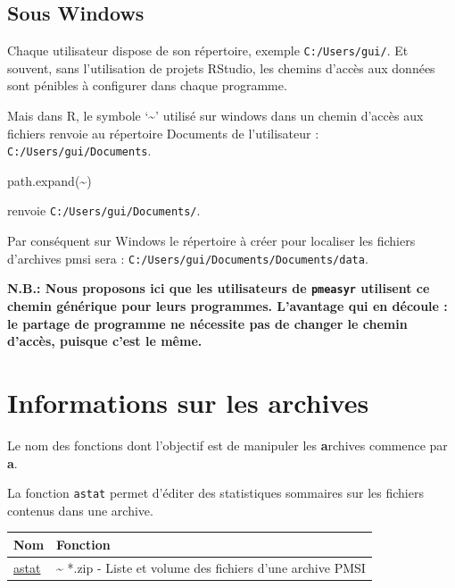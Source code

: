 \documentclass[
]{book}
\newenvironment{Shaded}{\begin{snugshade}}{\end{snugshade}}
\newcommand{\FunctionTok}[1]{\textcolor[rgb]{0.00,0.00,0.00}{#1}}
\newcommand{\NormalTok}[1]{#1}
\newcommand{\StringTok}[1]{\textcolor[rgb]{0.31,0.60,0.02}{#1}}
\begin{document}
\hypertarget{sous-windows}{%
\subsection{Sous Windows}\label{sous-windows}}

Chaque utilisateur dispose de son répertoire, exemple \texttt{C:/Users/gui/}. Et souvent, sans l'utilisation de projets RStudio, les chemins d'accès aux données sont pénibles à configurer dans chaque programme.

Mais dans R, le symbole `\textasciitilde{}' utilisé sur windows dans un chemin d'accès aux fichiers renvoie au répertoire Documents de l'utilisateur : \texttt{C:/Users/gui/Documents}.

\begin{Shaded}
\begin{Highlighting}[]
\FunctionTok{path.expand}\NormalTok{(}\StringTok{\textquotesingle{}\textasciitilde{}\textquotesingle{}}\NormalTok{)}
\end{Highlighting}
\end{Shaded}

renvoie \texttt{C:/Users/gui/Documents/}.

Par conséquent sur Windows le répertoire à créer pour localiser les fichiers d'archives pmsi sera : \texttt{C:/Users/gui/Documents/Documents/data}.

\textbf{N.B.: Nous proposons ici que les utilisateurs de \texttt{pmeasyr} utilisent ce chemin générique pour leurs programmes. L'avantage qui en découle : le partage de programme ne nécessite pas de changer le chemin d'accès, puisque c'est le même.}

\hypertarget{informations-sur-les-archives}{%
\section{Informations sur les archives}\label{informations-sur-les-archives}}

Le nom des fonctions dont l'objectif est de manipuler les \textbf{a}rchives commence par \textbf{a}.

La fonction \texttt{astat} permet d'éditer des statistiques sommaires sur les fichiers contenus dans une archive.

\begin{longtable}[]{@{}ll@{}}
\toprule
Nom & Fonction \\
\midrule
\endhead
\href{https://guillaumepressiat.github.io/pmeasyr/reference/astat.html}{astat} & \textasciitilde{} *.zip - Liste et volume des fichiers d'une archive PMSI \\
\bottomrule
\end{longtable}
\end{document}
